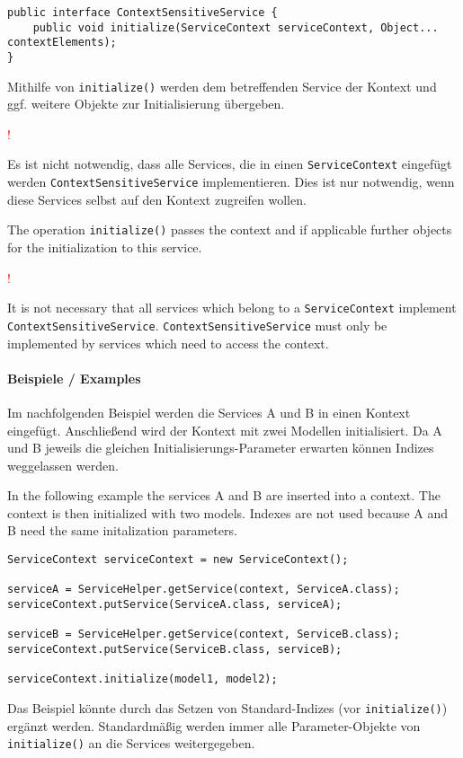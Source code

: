 \documentclass[10pt,a4paper]{scrartcl}
\newcommand{\hinweis}[1]{
\begin{framed}
\begin{minipage}[t]{0.02\textwidth}
\textcolor{red}{\Huge{\sffamily !}}
\end{minipage}
\begin{minipage}[t]{0.94\textwidth}
#1
\end{minipage}
\end{framed}
}
\providecommand{\deng}[2]{#1 / {\sffamily #2}}
\providecommand{\deutsch}[1]{#1}
\providecommand{\englisch}[1]{{\sffamily #1}}
\begin{document}
\begin{lstlisting}
public interface ContextSensitiveService {
	public void initialize(ServiceContext serviceContext, Object... contextElements);
}
\end{lstlisting}

\deutsch{Mithilfe von \texttt{initialize()} werden dem betreffenden Service der
Kontext und ggf. weitere Objekte zur Initialisierung übergeben.

\hinweis{Es ist nicht notwendig, dass alle Services, die in einen
\texttt{ServiceContext} eingefügt werden \texttt{ContextSensitiveService}
implementieren. Dies ist nur notwendig, wenn diese Services selbst auf den
Kontext zugreifen wollen.}}

\englisch{The operation \texttt{initialize()} passes the context and if 
applicable further objects for the initialization to this service.

\hinweis{It is not necessary that all services which belong to a
\texttt{ServiceContext} implement \texttt{ContextSensitiveService}.
\texttt{ContextSensitiveService} must only be implemented by services which need
to access the context.}}

\paragraph{\deng{Beispiele}{Examples}}
\deutsch{Im nachfolgenden Beispiel werden die Services A und B in einen Kontext eingefügt. 
Anschließend wird der Kontext mit zwei Modellen initialisiert. Da A und B jeweils
die gleichen Initialisierungs-Parameter erwarten können Indizes weggelassen werden.}

\englisch{In the following example the services A and B are inserted into a context. The context is then initialized with two models. Indexes are not used because A and B need the same initalization parameters.}

\begin{lstlisting}
ServiceContext serviceContext = new ServiceContext();

serviceA = ServiceHelper.getService(context, ServiceA.class); 
serviceContext.putService(ServiceA.class, serviceA);

serviceB = ServiceHelper.getService(context, ServiceB.class); 
serviceContext.putService(ServiceB.class, serviceB);

serviceContext.initialize(model1, model2);
\end{lstlisting}
\deutsch{Das Beispiel könnte durch das Setzen von Standard-Indizes (vor 
\texttt{initialize()}) ergänzt werden. Standardmäßig werden immer alle 
Parameter-Objekte von \texttt{initialize()} an die Services weitergegeben.}
\end{document}
